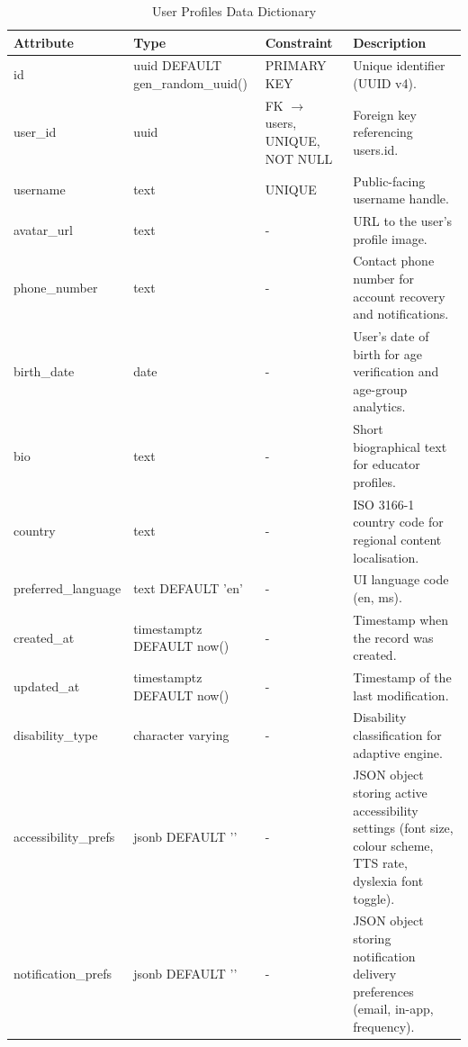 \documentclass[12pt, oneside]{article} %
\newcommand{\tabbreak}{\hyphenpenalty=200\exhyphenpenalty=200\tolerance=4000\hbadness=10000\hspace{0pt}}
\begin{document}
\begin{table}[H]
\caption{User Profiles Data Dictionary}
\label{tab:dd_user_profiles}
\vspace{-4mm}
\begin{center}
\renewcommand{\arraystretch}{1.15}
\scriptsize
\begin{tabular}{|>{\raggedright\arraybackslash\tabbreak}p{2.67cm}|>{\raggedright\arraybackslash\tabbreak}p{2.93cm}|>{\raggedright\arraybackslash\tabbreak}p{2.67cm}|>{\raggedright\arraybackslash\tabbreak}p{4.51cm}|}
\hline
\textbf{Attribute} & \textbf{Type} & \textbf{Constraint} & \textbf{Description} \\ \hline
id & uuid DEFAULT gen\_random\_uuid() & PRIMARY KEY & Unique identifier (UUID v4). \\ \hline
user\_id & uuid & FK $\rightarrow$ users, UNIQUE, NOT NULL & Foreign key referencing users.id. \\ \hline
username & text & UNIQUE & Public-facing username handle. \\ \hline
avatar\_url & text & - & URL to the user's profile image. \\ \hline
phone\_number & text & - & Contact phone number for account recovery and notifications. \\ \hline
birth\_date & date & - & User's date of birth for age verification and age-group analytics. \\ \hline
bio & text & - & Short biographical text for educator profiles. \\ \hline
country & text & - & ISO 3166-1 country code for regional content localisation. \\ \hline
preferred\_language & text DEFAULT 'en' & - & UI language code (en, ms). \\ \hline
created\_at & timestamptz DEFAULT now() & - & Timestamp when the record was created. \\ \hline
updated\_at & timestamptz DEFAULT now() & - & Timestamp of the last modification. \\ \hline
disability\_type & character varying & - & Disability classification for adaptive engine. \\ \hline
accessibility\_prefs & jsonb DEFAULT '{}' & - & JSON object storing active accessibility settings (font size, colour scheme, TTS rate, dyslexia font toggle). \\ \hline
notification\_prefs & jsonb DEFAULT '{}' & - & JSON object storing notification delivery preferences (email, in-app, frequency). \\ \hline
\end{tabular}
\end{center}
\end{table}
\end{document}
